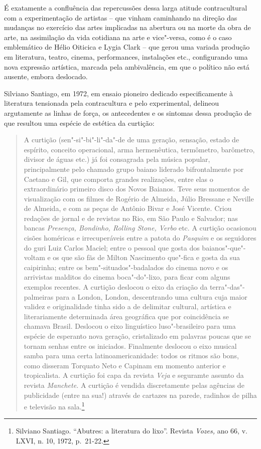 É exatamente a confluência das repercussões dessa larga atitude
contracultural com a experimentação de artistas -- que vinham caminhando
na direção das mudanças no exercício das artes implicadas na abertura ou
na morte da obra de arte, na assimilação da vida cotidiana na arte e
vice"-versa, como é o caso emblemático de Hélio Oiticica e Lygia Clark --
que gerou uma variada produção em literatura, teatro, cinema,
performances, instalações etc., configurando uma nova expressão
artística, marcada pela ambivalência, em que o político não está
ausente, embora deslocado.

\asterisc

Silviano Santiago, em 1972, em ensaio pioneiro dedicado especificamente
à literatura tensionada pela contracultura e pelo experimental, delineou
argutamente as linhas de força, os antecedentes e os sintomas dessa
produção de que resultou uma espécie de estética da curtição:

\begin{quote}
A curtição (sen"-si"-bi"-li"-da"-de de uma geração, sensação, estado de
espírito, conceito operacional, arma hermenêutica, termômetro,
barômetro, divisor de águas etc.) já foi consagrada pela música popular,
principalmente pelo chamado grupo baiano liderado bifrontalmente por
Caetano e Gil, que comporta grandes realizações, entre elas o
extraordinário primeiro disco dos Novos Baianos. Teve seus momentos de
visualização com os filmes de Rogério de Almeida, Júlio Bressane e
Neville de Almeida, e com as peças de Antônio Bivar e José Vicente.
Criou redações de jornal e de revistas no Rio, em São Paulo e Salvador;
nas bancas \emph{Presença, Bondinho, Rolling Stone, Verbo} etc. A
curtição ocasionou cisões homéricas e irrecuperáveis entre a patota do
\emph{Pasquim} e os seguidores do guri Luiz Carlos Maciel; entre o
pessoal que gosta dos baianos"-que"-voltam e os que são fãs de Milton
Nascimento que"-fica e gosta da sua caipirinha; entre os
bem"-situados"-badalados do cinema novo e os arrivistas malditos do cinema
boca"-do"-lixo, para ficar com alguns exemplos recentes. A curtição
deslocou o eixo da criação da terra"-das"-palmeiras para a London, London,
descentrando uma cultura cuja maior validez e originalidade tinha sido a
de delimitar cultural, artística e literariamente determinada área
geográfica que por coincidência se chamava Brasil. Deslocou o eixo
linguístico luso"-brasileiro para uma espécie de esperanto nova geração,
cristalizado em palavras poucas que se tornam senhas entre os iniciados.
Finalmente deslocou o eixo musical samba para uma certa
latinoamericanidade: todos os ritmos são bons, como disseram Torquato
Neto e Capinam em momento anterior e tropicalista. A curtição foi capa
da revista \emph{Veja} e seguramte assunto da revista \emph{Manchete.} A
curtição é vendida discretamente pelas agências de publicidade (entre na
sua!) através de cartazes na parede, radinhos de pilha e televisão na
sala.\footnote{Silviano Santiago. ``Abutres: a literatura do lixo''.
  Revista \emph{Vozes,} ano 66, v. \textsc{LXVI}, n. 10, 1972, p.~21-22.}
\end{quote}

